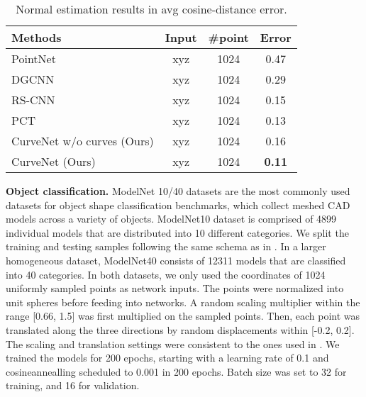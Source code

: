 \documentclass[10pt,twocolumn,letterpaper]{article}
\theoremstyle{definition}
\begin{document}
\begin{table} 
	\begin{center}
	\caption{Normal estimation results in avg cosine-distance error.}
		\begin{tabular}{l|ccc} 
			\toprule 
			Methods & Input & \#point & Error\\
			\hline
			\hline
			PointNet \cite{qi2017pointnet} & xyz & 1024 & 0.47\\
			DGCNN \cite{wang2019dynamic} & xyz & 1024  & 0.29 \\
			
			RS-CNN \cite{liu2019relation} & xyz & 1024 & 0.15 \\
			PCT \cite{guo2020pct}  & xyz & 1024  & 0.13 \\
			\hline
			CurveNet w/o curves (Ours) & xyz & 1024 & 0.16\\
			CurveNet (Ours) & xyz & 1024 &  \textbf{0.11}\\
			\bottomrule
		\end{tabular}
		
		\label{table:normal}

	\end{center}
	\vspace{-2em}
\end{table} 







\noindent
\textbf{Object classification.} ModelNet 10/40 datasets \cite{wu20153d} are the most commonly used datasets for object shape classification benchmarks, which collect meshed CAD models across a variety of objects. ModelNet10 dataset is comprised of 4899 individual models that are distributed into 10 different categories. We split the training and testing samples following the same schema as in \cite{liu2019point2sequence}. In a larger homogeneous dataset, ModelNet40 consists of 12311 models that are classified into 40 categories. In both datasets, we only used the coordinates of 1024 uniformly sampled points as network inputs. The points were normalized into unit spheres before feeding into networks. A random scaling multiplier within the range [0.66, 1.5] was first multiplied on the sampled points. Then, each point was translated along the three directions by random displacements within [-0.2, 0.2]. The scaling and translation settings were consistent to the ones used in \cite{klokov2017escape, liu2019relation}. We trained the models for 200 epochs, starting with a learning rate of 0.1 and cosineannealling scheduled to 0.001 in 200 epochs. Batch size was set to 32 for training, and 16 for validation.
\end{document}
